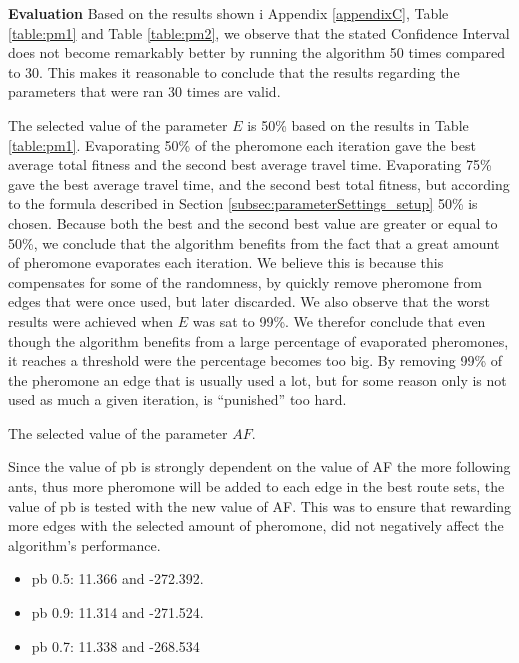 \textbf{Evaluation}
\newline
Based on the results shown i Appendix \ref{appendixC}, Table \vref{table:pm1} and Table \vref{table:pm2}, we observe that the stated Confidence Interval does not become remarkably better by running the algorithm 50 times compared to 30. This makes it reasonable to conclude that the results regarding the parameters that were ran 30 times are valid. 
\newline

The selected value of the parameter $E$ is 50\% based on the results in Table \vref{table:pm1}. Evaporating 50\% of the pheromone each iteration gave the best average total fitness and the second best average travel time. Evaporating 75\% gave the best average travel time, and the second best total fitness, but according to the formula described in Section \vref{subsec:parameterSettings_setup} 50\% is chosen. Because both the best and the second best value are greater or equal to 50\%, we conclude that the algorithm benefits from the fact that a great amount of pheromone evaporates each iteration. We believe this is because this compensates for some of the randomness, by quickly remove pheromone from edges that were once used, but later discarded. We also observe that the worst results were achieved when $E$ was sat to 99\%. We therefor conclude that even though the algorithm benefits from a large percentage of evaporated pheromones, it reaches a threshold were the percentage becomes too big. By removing 99\% of the pheromone an edge that is usually used a lot, but for some reason only is not used as much a given iteration, is ``punished'' too hard.

The selected value of the parameter $AF$.

Since the value of pb is strongly dependent on the value of AF the more following ants, thus more pheromone will be added to each edge in the best route sets, the value of pb is tested with the new value of AF. This was to ensure that rewarding more edges with the selected amount of pheromone, did not negatively affect the algorithm's performance. 
\begin{itemize}
\item pb 0.5: 11.366 and -272.392.
\item pb 0.9: 11.314 and -271.524. 
\item pb 0.7: 11.338 and -268.534
\end{itemize}







